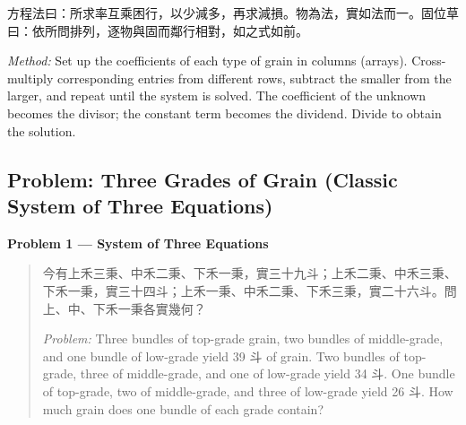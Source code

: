 \documentclass[11pt,a4paper]{article}
\newcommand{\zh}[1]{{#1}}
\newenvironment{chproblem}[1][]{%
  \par\medskip\noindent\textbf{\textcolor{sectioncolor}{#1}}\par\nopagebreak
  \begin{quote}\small
}{%
  \end{quote}\medskip
}
\newenvironment{chpassage}{%
  \par\medskip
  \begin{center}
  \begin{minipage}{0.95\textwidth}
  \setlength{\parindent}{2em}
  \linespread{1.3}\selectfont
}{%
  \end{minipage}
  \end{center}
  \medskip
}
\begin{document}
\begin{chpassage}
\zh{方程法曰：所求率互乘困行，以少減多，再求減損。物為法，實如法而一。固位草曰：依所問排列，逐物與固而鄰行相對，如之式如前。}

\medskip
\textit{Method:} Set up the coefficients of each type of grain in columns
(arrays). Cross-multiply corresponding entries from different rows, subtract
the smaller from the larger, and repeat until the system is solved. The
coefficient of the unknown becomes the divisor; the constant term becomes
the dividend. Divide to obtain the solution.
\end{chpassage}

\subsection{Problem: Three Grades of Grain (Classic System of Three Equations)}

\begin{chproblem}[Problem 1 --- System of Three Equations]
\zh{今有上禾三秉、中禾二秉、下禾一秉，實三十九斗；上禾二秉、中禾三秉、下禾一秉，實三十四斗；上禾一秉、中禾二秉、下禾三秉，實二十六斗。問上、中、下禾一秉各實幾何？}

\medskip
\textit{Problem:} Three bundles of top-grade grain, two bundles of
middle-grade, and one bundle of low-grade yield 39 \zh{斗} of grain. Two
bundles of top-grade, three of middle-grade, and one of low-grade yield 34
\zh{斗}. One bundle of top-grade, two of middle-grade, and three of
low-grade yield 26 \zh{斗}. How much grain does one bundle of each grade
contain?
\end{chproblem}
\end{document}
